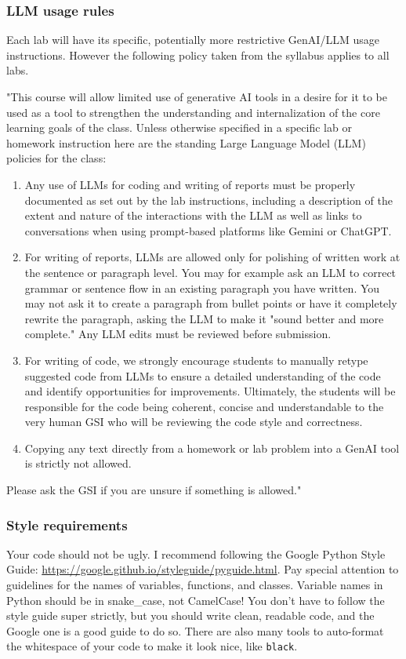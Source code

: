 \documentclass[letterpaper,12pt]{article}
\begin{document}
\subsubsection{LLM usage rules}
Each lab will have its specific, potentially more restrictive GenAI/LLM usage instructions. However the following policy taken from the syllabus applies to all labs.

"This course will allow limited use of generative AI tools in a desire for it to be used as a tool to strengthen the understanding and internalization of the core learning goals of the class. Unless otherwise specified in a specific lab or homework instruction here are the standing Large Language Model (LLM) policies for the class:
\begin{enumerate}
    \item Any use of LLMs for coding and writing of reports must be properly documented as set out by the lab instructions, including a description of the extent and nature of the interactions with the LLM as well as links to conversations when using prompt-based platforms like Gemini or ChatGPT.
    \item For writing of reports, LLMs are allowed only for polishing of written work at the sentence or paragraph level. You may for example ask an LLM to correct grammar or sentence flow in an existing paragraph you have written. You may not ask it to create a paragraph from bullet points or have it completely rewrite the paragraph, asking the LLM to make it "sound better and more complete." Any LLM edits must be reviewed before submission.
    \item For writing of code, we strongly encourage students to manually retype suggested code from LLMs to ensure a detailed understanding of the code and identify opportunities for improvements. Ultimately, the students will be responsible for the code being coherent, concise and understandable to the very human GSI who will be reviewing the code style and correctness.
    \item Copying any text directly from a homework or lab problem into a GenAI tool is strictly not allowed.
\end{enumerate}
Please ask the GSI if you are unsure if something is allowed."\\

\subsubsection{Style requirements}
Your code should not be ugly. I recommend following the Google Python Style Guide: \url{https://google.github.io/styleguide/pyguide.html}. Pay special attention to guidelines for the names of variables, functions, and classes. Variable names in Python should be in snake\_case, not CamelCase! You don't have to follow the style guide super strictly, but you should write clean, readable code, and the Google one is a good guide to do so. There are also many tools to auto-format the whitespace of your code to make it look nice, like \texttt{black}.
\end{document}
